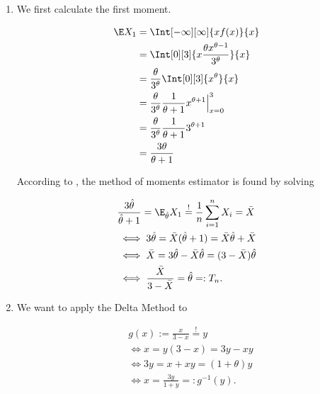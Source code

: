 \begin{solution}

\phantom{}

\begin{enumerate}[label = (\alph*)]

    \item We first calculate the first moment.
    
    \begin{align*}
        \E X_1
        & =
        \Int[-\infty][\infty]
        {
            x f(x)
        }{x} \\
        & =
        \Int[0][3]
        {
            x \frac{\theta x^{\theta - 1}}{3^\theta}
        }{x} \\
        & =
        \frac{\theta}{3^\theta}
        \Int[0][3]
        {
            x^\theta
        }{x} \\
        & =
        \frac{\theta}{3^\theta}
        \frac{1}{\theta + 1}
        x^{\theta + 1} \Big |_{x=0}^3 \\
        & =
        \frac{\theta}{3^\theta}
        \frac{1}{\theta + 1}
        3^{\theta + 1} \\
        & =
        \frac{3 \theta}{\theta + 1}
    \end{align*}

    According to \cite[lecture 6, slide 32]{EStat}, the method of moments estimator is found by solving

    \begin{align*}
        &
        \frac{3 \hat \theta}{\hat \theta + 1}
        =
        \E_{\hat \theta} X_1
        \stackrel{!}{=}
        \frac{1}{n}
        \sum_{i=1}^n
            X_i
        =
        \bar X \\
        & \iff
        3 \hat \theta = \bar X (\hat \theta + 1) = \bar X \hat \theta + \bar X \\
        & \iff
        \bar X = 3 \hat \theta - \bar X \hat \theta = (3 - \bar X) \hat \theta \\
        & \iff
        \frac{\bar X}{3 - \bar X} = \hat \theta =: T_n.
    \end{align*}

    \item We want to apply the Delta Method \cite[lecture 5, slide 10]{EStat} to
    
    \begin{align*}
        &
        g(x) := \frac{x}{3 - x} \stackrel{!}{=} y \\
        & \iff
        x = y (3 - x) = 3 y - x y \\
        & \iff
        3 y = x + x y = (1 + \theta) y \\
        & \iff
        x = \frac{3 y }{1 + y} =: g^{-1}(y).
    \end{align*}


\end{enumerate}
\end{solution}

